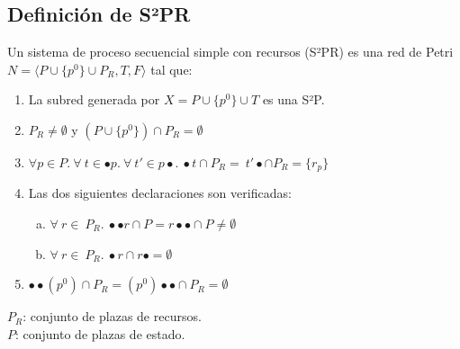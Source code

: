 \subsection{Definición de S²PR}
Un sistema de proceso secuencial simple con recursos (S²PR) es una red de Petri 
$N = \langle P \cup \{p^0\} \cup P_R, T, F \rangle $ tal que:
\begin{enumerate}
    \item La subred generada por $X = P \cup \{p^0\} \cup T$ es una S²P.
    \item $P_R \neq \emptyset$ y $(P \cup \{p^0\}) \cap P_R = \emptyset$
    \item $\forall p \in P.\ \forall \ t \in \bullet p.\ \forall \ t' \in p \bullet. \ \bullet t \cap P_R = \ t' \bullet \cap P_R = \{r_p\}$
    \item Las dos siguientes declaraciones son verificadas:
    \begin{enumerate}[a)]
        \item $\forall \ r \in \ P_R. \ \bullet \bullet r \cap P = r \bullet \bullet \cap P \neq \emptyset$
        \item $\forall \ r \in \ P_R. \ \bullet r \cap r \bullet = \emptyset$
    \end{enumerate}
    \item $\bullet \bullet (p^0) \cap P_R = (p^0) \bullet \bullet \cap P_R = \emptyset$
\end{enumerate}

\noindent $P_R$: conjunto de plazas de recursos. \\
$P$: conjunto de plazas de estado.

